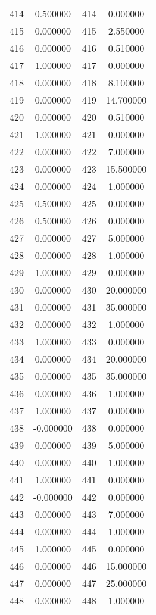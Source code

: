 \documentclass[12pt]{article}
\begin{document}
\begin{longtable}{@{}cccc@{}}
414 & 0.500000 & 414 & 0.000000 \\
415 & 0.000000 & 415 & 2.550000 \\
416 & 0.000000 & 416 & 0.510000 \\
417 & 1.000000 & 417 & 0.000000 \\
418 & 0.000000 & 418 & 8.100000 \\
419 & 0.000000 & 419 & 14.700000 \\
420 & 0.000000 & 420 & 0.510000 \\
421 & 1.000000 & 421 & 0.000000 \\
422 & 0.000000 & 422 & 7.000000 \\
423 & 0.000000 & 423 & 15.500000 \\
424 & 0.000000 & 424 & 1.000000 \\
425 & 0.500000 & 425 & 0.000000 \\
426 & 0.500000 & 426 & 0.000000 \\
427 & 0.000000 & 427 & 5.000000 \\
428 & 0.000000 & 428 & 1.000000 \\
429 & 1.000000 & 429 & 0.000000 \\
430 & 0.000000 & 430 & 20.000000 \\
431 & 0.000000 & 431 & 35.000000 \\
432 & 0.000000 & 432 & 1.000000 \\
433 & 1.000000 & 433 & 0.000000 \\
434 & 0.000000 & 434 & 20.000000 \\
435 & 0.000000 & 435 & 35.000000 \\
436 & 0.000000 & 436 & 1.000000 \\
437 & 1.000000 & 437 & 0.000000 \\
438 & -0.000000 & 438 & 0.000000 \\
439 & 0.000000 & 439 & 5.000000 \\
440 & 0.000000 & 440 & 1.000000 \\
441 & 1.000000 & 441 & 0.000000 \\
442 & -0.000000 & 442 & 0.000000 \\
443 & 0.000000 & 443 & 7.000000 \\
444 & 0.000000 & 444 & 1.000000 \\
445 & 1.000000 & 445 & 0.000000 \\
446 & 0.000000 & 446 & 15.000000 \\
447 & 0.000000 & 447 & 25.000000 \\
448 & 0.000000 & 448 & 1.000000 \\

\end{longtable}
\end{document}
